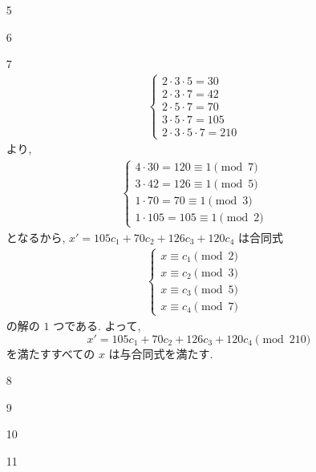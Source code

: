 \documentclass[12pt,a4paper]{jsarticle}
\begin{document}
\begin{enumerate}
\begin{itemize}
\begin{verbatim}
			\end{verbatim}
		\end{itemize}
 \item[5]  \mbox{} \\
 \item[6]  \mbox{} \\
 \item[7]  \mbox{} \\
	\begin{align*}
		\begin{cases}
			2 \cdot 3 \cdot 5 = 30 & \\
			2 \cdot 3 \cdot 7 = 42 & \\
			2 \cdot 5 \cdot 7 = 70 & \\
			3 \cdot 5 \cdot 7 = 105 & \\
			2 \cdot 3 \cdot 5 \cdot 7 = 210
		\end{cases}
	\end{align*}
	より,
	\begin{align*}
		\begin{cases}
			4 \cdot 30 = 120 \equiv 1 \pmod{7} & \\
			3 \cdot 42 = 126 \equiv 1 \pmod{5} & \\
			1 \cdot 70 = 70 \equiv 1 \pmod{3} & \\
			1 \cdot 105 = 105 \equiv 1 \pmod{2}
		\end{cases}
	\end{align*}
	となるから, $x' = 105c_1 + 70c_2 + 126c_3 + 120c_4$ は合同式
	\begin{align*}
		\begin{cases}
			x \equiv c_1 \pmod{2} & \\
			x \equiv c_2 \pmod{3} & \\
			x \equiv c_3 \pmod{5} & \\
			x \equiv c_4 \pmod{7}
		\end{cases}
	\end{align*}
	の解の $1$ つである. よって,
	\[ x' = 105c_1 + 70c_2 + 126c_3 + 120c_4 \pmod{210} \]
	を満たすすべての $x$ は与合同式を満たす.
 \item[8]  \mbox{} \\
 \item[9]  \mbox{} \\
 \item[10]  \mbox{} \\
 \item[11]  \mbox{} \\
\end{enumerate}
\pagebreak
\end{document}
